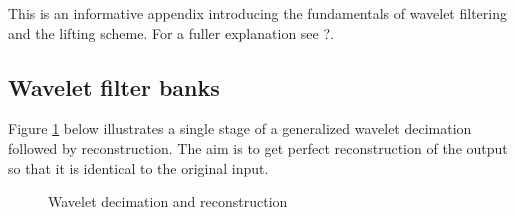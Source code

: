 \begin{informative*}
This is an informative appendix introducing the fundamentals of wavelet
filtering and the lifting scheme. For a fuller explanation see ?.

\subsection{Wavelet filter banks}

Figure \ref{fig:decimatereconstruct} below illustrates a single stage of a 
generalized wavelet decimation followed by reconstruction. The aim is to 
get perfect reconstruction of the output so that it is identical to the original input. 
\end{informative*}
\setlength{\unitlength}{1em}
\begin{figure}[!ht]
\caption{Wavelet decimation and reconstruction}\label{fig:decimatereconstruct}
\end{figure}

